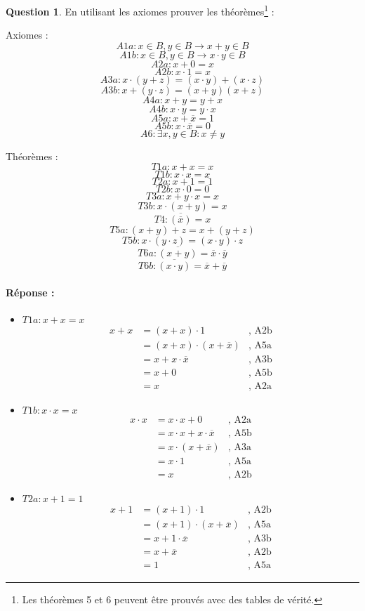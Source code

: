 \documentclass[11pt,a4paper]{article}
\theoremstyle{definition}%
\newtheorem{Q}{Question}[] %
\newcommand{\reponse}[1]{%
	\ifthenelse {\boolean{corrige}} {\paragraph{Réponse :} \color{darkblue}   #1\color{black}} {}
 }
\begin{document}
\begin{Q}
	En utilisant les axiomes prouver les théorèmes\footnote{Les théorèmes 5 et 6 peuvent être prouvés avec des tables de vérité.} :

\begin{minipage}[t]{0.5\linewidth}
	\centering Axiomes :
	$$A1a : x \in B, y \in B \rightarrow x+y \in B$$
	$$A1b : x \in B, y \in B \rightarrow x \cdot y \in B$$
	$$A2a : x+0 = x$$
	$$A2b : x \cdot 1 = x$$
	$$A3a : x \cdot (y+z) = (x \cdot y) + (x \cdot z)$$
	$$A3b : x+ (y \cdot z) = (x+y)(x+z)$$
	$$A4a : x+y = y+x$$
	$$A4b : x \cdot y = y \cdot x$$
	$$A5a : x+\overline{x} = 1$$
	$$A5b : x \cdot \overline{x} = 0$$
	$$A6 : \exists x, y \in B : x \neq y$$
\end{minipage}
\begin{minipage}[t]{0.5\linewidth}
	\centering Théorèmes :
	$$T1a : x+x=x$$
	$$T1b : x \cdot x=x$$
	$$T2a : x+1=1$$
	$$T2b : x \cdot 0=0$$
	$$T3a : x+y \cdot x=x$$
	$$T3b : x \cdot (x+y)=x$$
	$$T4 : \overline{(\overline{x})}=x$$
	$$T5a : (x+y)+z = x + (y+z)$$
	$$T5b : x \cdot (y \cdot z) = (x \cdot y) \cdot z$$
	$$T6a : \overline{(x+y)} = \overline{x} \cdot \overline{y}$$
	$$T6b : \overline{(x \cdot y)} = \overline{x} + \overline{y}$$
\end{minipage}

\reponse{
\begin{itemize}
	\item $T1a : x+x=x$
	\begin{align*}
		x + x & = (x + x) \cdot 1&\mbox{, A2b}\\
		& = (x + x) \cdot (x + \overline{x})&\mbox{, A5a}\\
		& = x + x \cdot \overline{x}&\mbox{, A3b}\\
		& = x + 0 & \mbox{, A5b}\\
		& = x &\mbox{, A2a}
	\end{align*}

	\item $T1b : x \cdot x=x$
	\begin{align*}
		x \cdot x & = x \cdot x  + 0&\mbox{, A2a}\\
		& = x\cdot x + x \cdot \overline{x} &\mbox{, A5b}\\
		& = x \cdot (x + \overline{x}) &\mbox{, A3a} \\
		& = x \cdot 1&\mbox{, A5a}\\
		& = x&\mbox{, A2b}
	\end{align*}

	\item $T2a : x+1=1$
	\begin{align*}
		x + 1 & = (x+1) \cdot 1&\mbox{, A2b}\\
		& = (x+1) \cdot (x+\overline{x})&\mbox{, A5a}\\
		& = x + 1 \cdot \overline{x} &\mbox{, A3b}\\
		& = x + \overline{x} &\mbox{, A2b}\\
		& = 1 &\mbox{, A5a}
	\end{align*}


\end{itemize}}
\end{Q}
\end{document}
